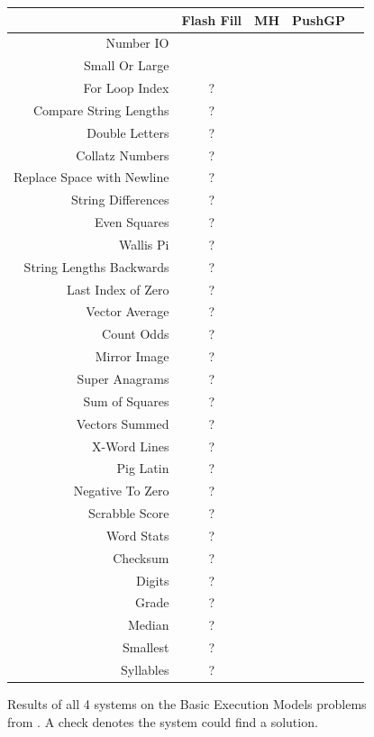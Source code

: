 \begin{figure}
\begin{tabular}{ r | c c c c }
	& Flash Fill & MH & PushGP \\
	\hline
	Number IO &  & \checkmark & \checkmark  \\
	Small Or Large &  &  & \checkmark  \\
	For Loop Index & ? &  & \checkmark  \\
	Compare String Lengths & ? &  & \checkmark  \\
	Double Letters & ? &  & \checkmark  \\
	Collatz Numbers & ? &  &   \\
	Replace Space with Newline & ? &  & \checkmark  \\
	String Differences & ? &  &   \\
	Even Squares & ? &  & \checkmark  \\
	Wallis Pi & ? &  &   \\
	String Lengths Backwards & ? & \checkmark  & \checkmark \\
	Last Index of Zero & ? &  & \checkmark  \\
	Vector Average & ? & \checkmark & \checkmark  \\
	Count Odds & ? &  & \checkmark  \\
	Mirror Image & ? &  & \checkmark  \\
	Super Anagrams & ? &  & \checkmark  \\
	Sum of Squares & ? &  & \checkmark  \\
	Vectors Summed & ? & \checkmark & \checkmark  \\
	X-Word Lines & ? &  & \checkmark  \\
	Pig Latin & ? &  & \checkmark  \\
	Negative To Zero & ? & \checkmark & \checkmark  \\
	Scrabble Score & ? &  & \checkmark  \\
	Word Stats & ? &  &   \\
	Checksum & ? &  &   \\
	Digits & ? &  & \checkmark  \\
	Grade & ? &  & \checkmark  \\
	Median & ? &  & \checkmark  \\
	Smallest & ? & \checkmark & \checkmark  \\
	Syllables & ? &  & \checkmark  \\
\end{tabular}
\caption{Results of all 4 systems on the Basic Execution Models problems from \cite{Gaunt2016}. A check denotes the system could find a solution.}
\label{fig:results2}
\end{figure}

